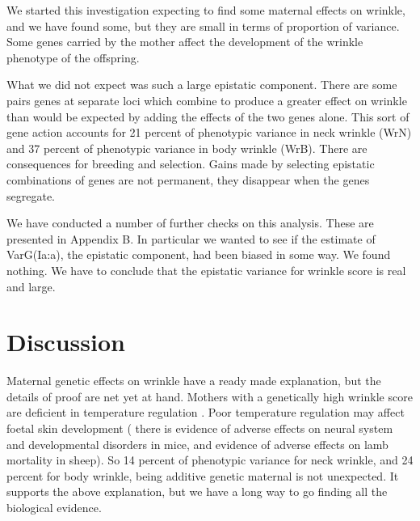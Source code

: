 \documentclass[titlepage]{article}  %
\begin{document}
We started this investigation expecting to find some maternal effects on wrinkle, and we have found some, but they are small in terms of proportion of variance. Some genes carried by the mother affect the development of the wrinkle phenotype of the offspring. 

What we did not expect was such a large epistatic component. There are some pairs genes at separate loci which combine to produce a greater effect on wrinkle than would be expected by adding the effects of the two genes alone. This sort of gene action accounts for 21 percent of phenotypic variance in neck wrinkle (WrN) and 37 percent of phenotypic variance in body wrinkle (WrB). There are consequences for breeding and selection. Gains made by selecting epistatic combinations of genes are not permanent, they disappear when the genes segregate.

We have conducted a number of further checks on this analysis. These are presented in Appendix B. In particular we wanted to see if the estimate of VarG(Ia:a), the epistatic component, had been biased in some way. We found nothing. We have to conclude that the epistatic variance for wrinkle score is real and large.



\section{Discussion}
Maternal genetic effects on wrinkle  have a ready made explanation, but the details of proof are net yet at hand. Mothers with a genetically high wrinkle score are deficient in temperature regulation . Poor temperature regulation may affect foetal skin development ( there is evidence of adverse effects on neural system and developmental disorders in mice, and evidence of adverse effects on lamb mortality in sheep). So 14 percent of phenotypic variance for neck wrinkle, and 24 percent for body wrinkle, being additive genetic maternal is not unexpected.  It supports the above explanation, but we have a long way to go finding all the biological evidence.
\end{document}
